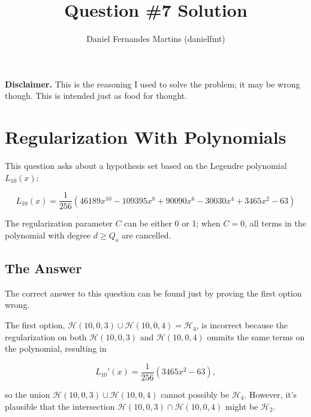 \documentclass{article}
\author{Daniel Fernandes Martins (danielfmt)}
\title{Question \#7 Solution}
\begin{document}
\maketitle

\textbf{Disclaimer.} This is the reasoning I used to solve the problem; it
may be wrong though. This is intended just as food for thought.

\section{Regularization With Polynomials}

This question asks about a hypothesis set based on the Legendre polynomial
$L_{10}(x)$:

\begin{equation*}
L_{10}(x) = \frac{1}{256}(46189x^{10} - 109395x^8 + 90090x^6 - 30030x^4 + 3465x^2 - 63)
\end{equation*}

The regularization parameter $C$ can be either 0 or 1; when $C=0$, all terms
in the polynomial with degree $d \geq Q_o$ are cancelled.

\subsection{The Answer}

The correct answer to this question can be found just by proving the first
option wrong.

The first option, $\mathcal{H}(10,0,3) \cup \mathcal{H}(10,0,4) = \mathcal{H}_4$,
is incorrect because the regularization on both $\mathcal{H}(10,0,3)$ and
$\mathcal{H}(10,0,4)$ ommits the same terms on the polynomial, resulting in

\begin{equation*}
L_{10}'(x) = \frac{1}{256}(3465x^2 - 63),
\end{equation*}

so the union $\mathcal{H}(10,0,3) \cup \mathcal{H}(10,0,4)$ cannot possibly be
$\mathcal{H}_4$. However, it's plausible that the intersection
$\mathcal{H}(10,0,3) \cap \mathcal{H}(10,0,4)$ might be $\mathcal{H}_2$.
\end{document}
